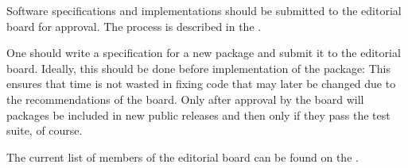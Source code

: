 Software specifications and implementations should be submitted to the
editorial board for approval. The process is described in the 
. 


One should write a specification for a new package
and submit it to the editorial board.
Ideally, this should be done before implementation of the package: This
ensures that time is not wasted in fixing code that may later be changed
due to the recommendations of the board.
Only after approval by the board will packages be included in new
public releases and then only if they pass the test suite, of course.

The current list of members of the editorial board can be found on the 
.


